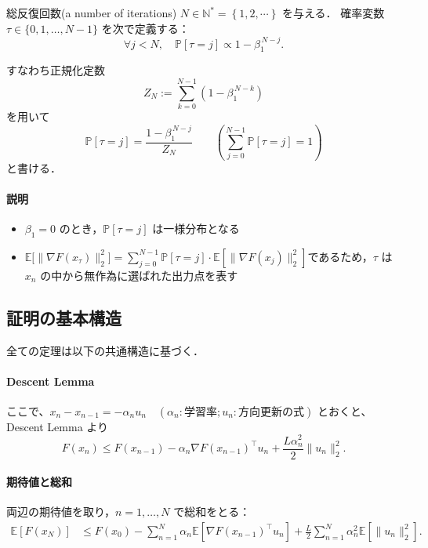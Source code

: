 \documentclass[dvipdfmx,a4paper,11pt]{jsarticle}
\begin{document}
総反復回数(a number of iterations) $N \in \mathbb{N}^* = \left\{1,2,\cdots\right\}$ を与える．
確率変数 $\tau \in \{0,1,\dots,N-1\}$ を次で定義する：
\begin{equation}
    \forall j < N,\quad
    \mathbb{P}[\tau = j] \propto 1 - \beta_1^{\,N-j}.
    \tag{9}
\end{equation}

すなわち正規化定数
\[
    Z_N := \sum_{k=0}^{N-1} \left(1-\beta_1^{\,N-k}\right)
\]
を用いて
\[
    \mathbb{P}[\tau=j]
    = \frac{1-\beta_1^{\,N-j}}{Z_N}\quad\quad \left(\displaystyle\sum_{j=0}^{N-1} \mathbb{P}[\tau=j] = 1\right)
\]
と書ける．

\paragraph{説明}
\begin{itemize}
    \item $\beta_1=0$ のとき，$\mathbb{P}[\tau=j]$ は一様分布となる
    \item $\mathbb{E}\big[\|\nabla F(x_\tau)\|_2^2\big] = \displaystyle\sum_{j=0}^{N-1} \mathbb{P}[\tau=j] \cdot \mathbb{E}[\|\nabla F(x_j)\|_2^2] $であるため，$\tau$ は $x_n$ の中から無作為に選ばれた出力点を表す
\end{itemize}

\bigskip
\subsection{証明の基本構造}

全ての定理は以下の共通構造に基づく．

\paragraph{Descent Lemma}
ここで、$x_n - x_{n-1} = -\alpha_n u_n\quad (\alpha_n:学習率; u_n:方向更新の式)$ とおくと、Descent Lemma より
\begin{equation}
    F(x_n)
    \leq F(x_{n-1})
    - \alpha_n \nabla F(x_{n-1})^\top u_n
    + \frac{L\alpha_n^2}{2}\|u_n\|_2^2.
\end{equation}

\paragraph{期待値と総和}
両辺の期待値を取り，$n=1,\dots,N$ で総和をとる：
\begin{align}
    \mathbb{E}[F(x_N)]
    &\leq F(x_0)
    - \sum_{n=1}^N \alpha_n
      \mathbb{E}[\nabla F(x_{n-1})^\top u_n]
    + \frac{L}{2}\sum_{n=1}^N \alpha_n^2
      \mathbb{E}[\|u_n\|_2^2].
\end{align}
\end{document}
